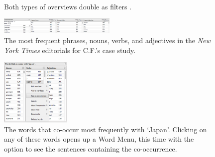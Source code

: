 \documentclass{sig-alternate}
\begin{document}
\begin{figure}[ht!]
\begin{center}
%
        \\
%
    \end{center}
    \caption{%
     Both types of overviews double as filters \label{fig:intro04}.
     }%
\end{figure}

\begin{figure}[ht!]
\begin{center}
	\includegraphics[width=0.5\textwidth]{fig/intro/06.png}
\end{center}
    \caption{%
       The most frequent phrases, nouns, verbs, and adjectives in the \emph{New York Times} editorials for C.F.'s case study.  \label{fig:intro06}
     }%
\end{figure}

\begin{figure}[ht!]
\begin{center}
	\includegraphics[width=0.3\textwidth]{fig/intro/09.png}
\end{center}
    \caption{%
 		The words that co-occur most frequently with `Japan'. Clicking on any of these words opens up a Word Menu, this time with the option to see the sentences containing the co-occurrence.
	\label{fig:intro09}}%
\end{figure}
\end{document}
